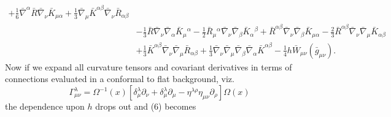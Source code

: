 \documentclass[10pt,letterpaper]{article}
\newcommand{\pd}{\partial}
\begin{document}
\begin{align}
 + \tfrac{1}{6} \bar\nabla^{\alpha}\bar R \bar\nabla_{\nu}\bar K_{\mu \alpha}
 + \tfrac{1}{3} \bar\nabla_{\mu}\bar K^{\alpha \beta} \bar\nabla_{\nu}\bar R_{\alpha \beta}\nonumber\\
& -  \tfrac{1}{3} \bar R \bar\nabla_{\nu}\bar\nabla_{\alpha}\bar K_{\mu}{}^{\alpha}
 -  \tfrac{1}{2} \bar R_{\mu}{}^{\alpha} \bar\nabla_{\nu}\bar\nabla_{\beta}\bar K_{\alpha}{}^{\beta}
 + \bar R^{\alpha \beta} \bar\nabla_{\nu}\bar\nabla_{\beta}\bar K_{\mu \alpha}
 -  \tfrac{2}{3} \bar R^{\alpha \beta} \bar\nabla_{\nu}\bar\nabla_{\mu}\bar K_{\alpha \beta}\nonumber\\
& + \tfrac{1}{3} \bar K^{\alpha \beta} \bar\nabla_{\nu}\bar\nabla_{\mu}\bar R_{\alpha \beta}
 + \tfrac{1}{3} \bar\nabla_{\nu}\bar\nabla_{\mu}\bar\nabla_{\beta}\bar\nabla_{\alpha}\bar K^{\alpha \beta}
 -\tfrac14 h \bar W_{\mu\nu}(\bar g_{\mu\nu}).
\end{align}
Now if we expand all curvature tensors and covariant derivatives in terms of connections evaluated in a conformal to flat background, viz.
\begin{equation}
	\Gamma^\lambda_{\mu\nu} = \Omega^{-1}(x)[\delta^\lambda_\mu \pd_\nu + \delta^\lambda_\mu\pd_\mu - \eta^{\lambda\rho}\eta_{\mu\nu}\pd_\rho]\Omega(x)
\end{equation}
the dependence upon $h$ drops out and (6) becomes
\end{document}
